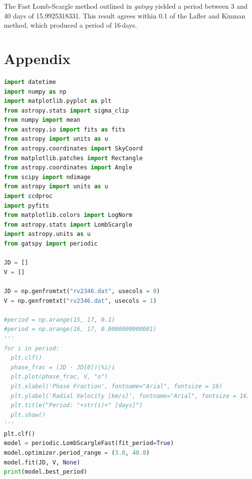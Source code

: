 \documentclass[onecolumn]{aastex6}
\begin{document}
The Fast Lomb-Scargle method outlined in \textit{gatspy} yielded a period between 3 and 40 days of 15.9925318331. This result agrees within 0.1 of the Lafler and Kinman method, which produced a period of 16\,days.



\clearpage
\section{Appendix}


\begin{lstlisting}[language=Python, caption=Python example]
import datetime
import numpy as np
import matplotlib.pyplot as plt
from astropy.stats import sigma_clip
from numpy import mean
from astropy.io import fits as fits
from astropy import units as u
from astropy.coordinates import SkyCoord
from matplotlib.patches import Rectangle
from astropy.coordinates import Angle
from scipy import ndimage
from astropy import units as u
import ccdproc
import pyfits
from matplotlib.colors import LogNorm
from astropy.stats import LombScargle
import astropy.units as u
from gatspy import periodic

JD = []
V = []

JD = np.genfromtxt("rv2346.dat", usecols = 0)
V = np.genfromtxt("rv2346.dat", usecols = 1)

#period = np.arange(15, 17, 0.1)
#period = np.arange(16, 17, 0.0000000000001)
'''
for i in period:
  plt.clf()
  phase_frac = (JD - JD[0])\%i/i
  plt.plot(phase_frac, V, "o")
  plt.xlabel('Phase Fraction', fontname="Arial", fontsize = 16)
  plt.ylabel('Radial Velocity [km/s]', fontname="Arial", fontsize = 16)
  plt.title("Period: "+str(i)+" [days]")
  plt.show()
'''
plt.clf()
model = periodic.LombScargleFast(fit_period=True)
model.optimizer.period_range = (3.0, 40.0)
model.fit(JD, V, None)
print(model.best_period)
\end{lstlisting}
\clearpage
\end{document}
